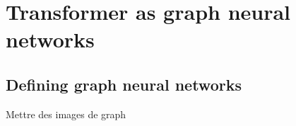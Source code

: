 







\section{Transformer as graph neural networks}

\subsection{Defining graph neural networks}

Mettre des images de graph

